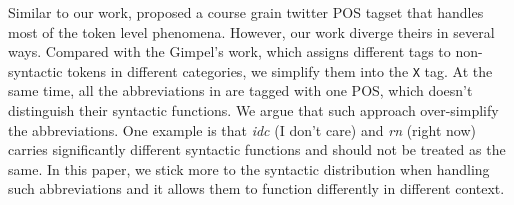 \documentclass[11pt,letterpaper]{article}
\begin{document}
Similar to our work,  proposed a course grain twitter POS tagset that handles most of the token level phenomena.
However, our work diverge theirs in several ways.
Compared with the Gimpel's work, which assigns different tags to non-syntactic tokens in different categories, we simplify them into the {\tt X} tag.
At the same time, all the abbreviations in  are tagged with one POS, which doesn't distinguish their syntactic functions.
We argue that such approach over-simplify the abbreviations.
One example is that {\it idc} (I don't care) and {\it rn} (right now) carries significantly different syntactic functions and should not be treated as the same.
In this paper, we stick more to the syntactic distribution when handling such abbreviations and it allows them to function differently in different context.
\end{document}
